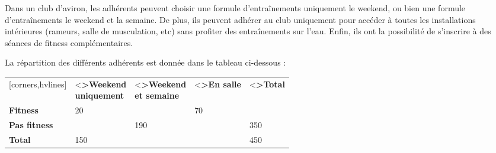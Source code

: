 \documentclass[a4paper,11pt]{article}
\begin{document}
\pagebreak


\medskip

Dans un club d’aviron, les adhérents peuvent choisir une formule d’entraînements uniquement le weekend, ou bien une formule d'entraînements le weekend et la semaine. De plus, ils peuvent adhérer au club uniquement pour accéder à toutes les installations intérieures (rameurs, salle de musculation, etc) sans profiter des 
entraînements sur l'eau. Enfin, ils ont la possibilité de s’inscrire à des séances de fitness complémentaires.

La répartition des différents adhérents est donnée dans le tableau ci-dessous :

\begin{center}
	\renewcommand\arraystretch{1.25}
	\begin{NiceTabular}{W{c}{2.5cm}W{c}{2.5cm}W{c}{2.5cm}W{c}{2.5cm}W{c}{2.5cm}}[corners,hvlines]
		 & \Block[c]{}<\bfseries>{Weekend \\ uniquement} & \Block[c]{}<\bfseries>{Weekend \\ et semaine} & \Block[c]{}<\bfseries>{En salle} & \Block[c]{}<\bfseries>{Total} \\
		\textbf{Fitness} & 20 & & 70 & \\
		\textbf{Pas fitness} & & 190 & & 350 \\
		\textbf{Total} & 150 & & & 450 \\
	\end{NiceTabular}
\end{center}
\end{document}
